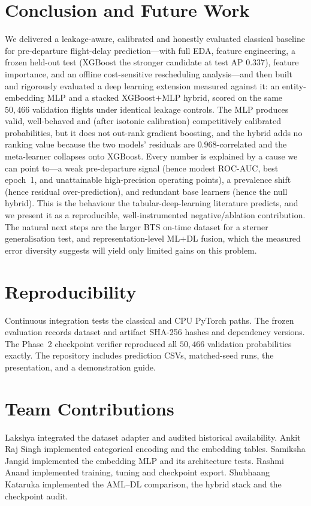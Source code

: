 \documentclass[conference]{IEEEtran}
\begin{document}
\section{Conclusion and Future Work}
\label{sec:conclusion}
We delivered a leakage-aware, calibrated and honestly evaluated classical
baseline for pre-departure flight-delay prediction---with full EDA, feature
engineering, a frozen held-out test (XGBoost the stronger candidate at test AP
$0.337$), feature importance, and an offline cost-sensitive rescheduling
analysis---and then built and rigorously evaluated a deep learning extension
measured against it: an entity-embedding MLP and a stacked XGBoost$+$MLP hybrid,
scored on the same $50{,}466$ validation flights under identical leakage
controls. The MLP produces valid, well-behaved and (after isotonic calibration)
competitively calibrated probabilities, but it does not out-rank gradient
boosting, and the hybrid adds no ranking value because the two models' residuals
are $0.968$-correlated and the meta-learner collapses onto XGBoost. Every number
is explained by a cause we can point to---a weak pre-departure signal (hence
modest ROC-AUC, best epoch~1, and unattainable high-precision operating points), a
prevalence shift (hence residual over-prediction), and redundant base learners
(hence the null hybrid). This is the behaviour the tabular-deep-learning
literature predicts, and we present it as a reproducible, well-instrumented
negative/ablation contribution. The natural next steps are the larger BTS on-time
dataset for a sterner generalisation test, and representation-level ML$+$DL
fusion, which the measured error diversity suggests will yield only limited gains
on this problem.

\section*{Reproducibility}
Continuous integration tests the classical and CPU PyTorch paths. The frozen
evaluation records dataset and artifact SHA-256 hashes and dependency versions.
The Phase~2 checkpoint verifier reproduced all $50{,}466$ validation
probabilities exactly. The repository includes prediction CSVs, matched-seed
runs, the presentation, and a demonstration guide.

\section*{Team Contributions}
Lakshya integrated the dataset adapter and audited historical availability.
Ankit Raj Singh implemented categorical encoding and the embedding tables.
Samiksha Jangid implemented the embedding MLP and its architecture tests.
Rashmi Anand implemented training, tuning and checkpoint export.
Shubhaang Kataruka implemented the AML--DL comparison, the hybrid stack and the
checkpoint audit.
\end{document}
